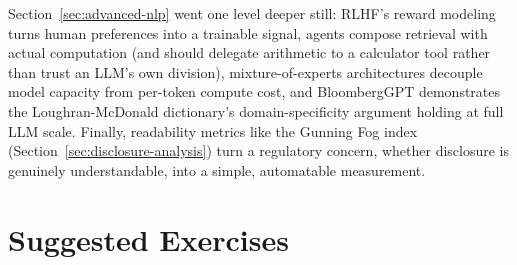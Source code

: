 \documentclass[../ai_in_finance]{subfiles}
\begin{document}
Section~\ref{sec:advanced-nlp} went one
level deeper still: RLHF's reward modeling turns human preferences into a trainable signal, agents compose retrieval with actual computation
(and should delegate arithmetic to a calculator tool rather than trust an LLM's own division), mixture-of-experts architectures decouple model
capacity from per-token compute cost, and BloombergGPT demonstrates the Loughran-McDonald dictionary's domain-specificity argument holding at full
 LLM scale. Finally, readability metrics like the Gunning Fog index (Section~\ref{sec:disclosure-analysis}) turn a regulatory concern, whether disclosure
  is genuinely understandable, into a simple, automatable measurement.

\section{Suggested Exercises}
\end{document}
